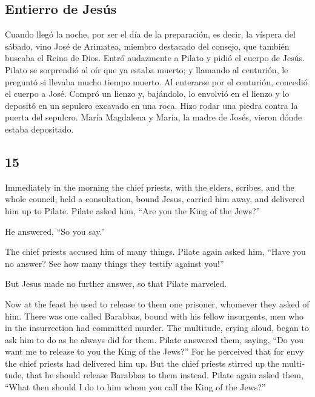 \begin{paracol}{2}
\hypertarget{entierro-de-jesuxfas}{%
\subsection{Entierro de Jesús}\label{entierro-de-jesuxfas}}

 Cuando llegó la noche, por ser el día de la preparación,
es decir, la víspera del sábado,  vino José de Arimatea,
miembro destacado del consejo, que también buscaba el Reino de Dios.
Entró audazmente a Pilato y pidió el cuerpo de Jesús. 
Pilato se sorprendió al oír que ya estaba muerto; y llamando al
centurión, le preguntó si llevaba mucho tiempo muerto. 
Al enterarse por el centurión, concedió el cuerpo a José.
 Compró un lienzo y, bajándolo, lo envolvió en el lienzo
y lo depositó en un sepulcro excavado en una roca. Hizo rodar una piedra
contra la puerta del sepulcro.  María Magdalena y María,
la madre de Josés, vieron dónde estaba depositado.

\switchcolumn
\begin{otherlanguage}{english}

\hypertarget{section-28}{%
\section{15}\label{section-28}}

 Immediately in the morning the chief priests, with the
elders, scribes, and the whole council, held a consultation, bound
Jesus, carried him away, and delivered him up to Pilate. 
Pilate asked him, ``Are you the King of the Jews?''

He answered, ``So you say.''

 The chief priests accused him of many things.
 Pilate again asked him, ``Have you no answer? See how
many things they testify against you!''

 But Jesus made no further answer, so that Pilate
marveled.

 Now at the feast he used to release to them one prisoner,
whomever they asked of him.  There was one called
Barabbas, bound with his fellow insurgents, men who in the insurrection
had committed murder.  The multitude, crying aloud, began
to ask him to do as he always did for them.  Pilate
answered them, saying, ``Do you want me to release to you the King of
the Jews?''  For he perceived that for envy the chief
priests had delivered him up.  But the chief priests
stirred up the multitude, that he should release Barabbas to them
instead.  Pilate again asked them, ``What then should I
do to him whom you call the King of the Jews?''


\end{otherlanguage}
\end{paracol}
